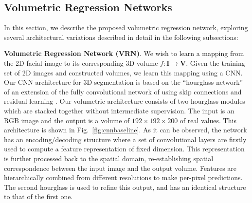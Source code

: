 \subsection{Volumetric Regression Networks}


In this section, we describe the proposed volumetric regression network, exploring several architectural variations described in detail in the following subsections:

\textbf{Volumetric Regression Network (VRN)}. We wish to learn a mapping from the 2D facial image to its
corresponding 3D volume $f: \mathbf{I} \rightarrow \mathbf{V}$. Given
the training set of 2D images and constructed volumes, we learn this mapping using a CNN. Our CNN
architecture for 3D segmentation is based on the ``hourglass
network'' of \cite{newell2016stacked} an extension of the fully
convolutional network of \cite{long2015fully} using skip connections
and residual learning \cite{he2015deep}. Our volumetric architecture consists of two hourglass
modules which are stacked together without intermediate
supervision. The input is an RGB image and the output is a volume of $192\times 192\times 200$ of real values. This architecture is
shown in Fig.~\ref{fig:cnnbaseline}. As it can be observed, the
network has an encoding/decoding structure where a set of convolutional layers are firstly used to compute a feature representation of fixed dimension. This representation is further processed back to the spatial domain, re-establishing spatial correspondence between the input image and the output volume. Features are hierarchically
combined from different resolutions to make per-pixel predictions. The second hourglass is used to refine this output, and has an identical structure to that of the first one.


